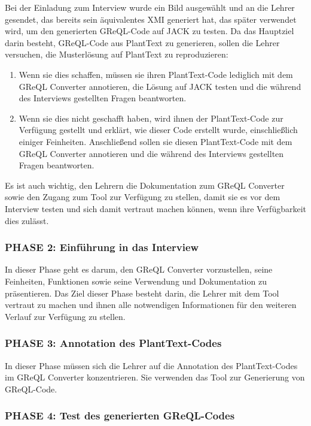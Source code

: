 Bei der Einladung zum Interview wurde ein Bild ausgewählt und an die Lehrer gesendet, das bereits sein äquivalentes XMI
generiert hat, das später verwendet wird, um den generierten GReQL-Code auf JACK zu testen. Da das Hauptziel darin
besteht, GReQL-Code aus PlantText zu generieren, sollen die Lehrer versuchen, die Musterlösung auf PlantText zu
reproduzieren:

\begin{enumerate}
    \item Wenn sie dies schaffen, müssen sie ihren PlantText-Code lediglich mit dem GReQL Converter annotieren, die
Lösung auf JACK testen und die während des Interviews gestellten Fragen beantworten.
    \item Wenn sie dies nicht geschafft haben, wird ihnen der PlantText-Code zur Verfügung gestellt und erklärt, wie
dieser Code erstellt wurde, einschließlich einiger Feinheiten. Anschließend sollen sie diesen PlantText-Code mit dem
GReQL Converter annotieren und die während des Interviews gestellten Fragen beantworten.
\end{enumerate}

Es ist auch wichtig, den Lehrern die Dokumentation zum GReQL Converter sowie den Zugang zum Tool zur Verfügung zu
stellen, damit sie es vor dem Interview testen und sich damit vertraut machen können, wenn ihre Verfügbarkeit dies
zulässt.

\subsubsection{PHASE 2: Einführung in das Interview}

In dieser Phase geht es darum, den GReQL Converter vorzustellen, seine Feinheiten, Funktionen sowie seine Verwendung und
Dokumentation zu präsentieren. Das Ziel dieser Phase besteht darin, die Lehrer mit dem Tool vertraut zu machen und
ihnen alle notwendigen Informationen für den weiteren Verlauf zur Verfügung zu stellen.

\subsubsection{PHASE 3: Annotation des PlantText-Codes}

In dieser Phase müssen sich die Lehrer auf die Annotation des PlantText-Codes im GReQL Converter konzentrieren. Sie
verwenden das Tool zur Generierung von GReQL-Code.

\subsubsection{PHASE 4: Test des generierten GReQL-Codes}

